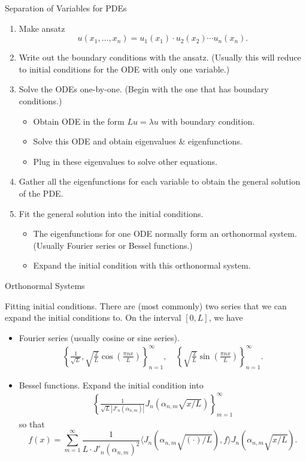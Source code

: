 \documentclass[hyperref={pdfpagelabels=true}]{beamer}
\newcommand{\structb}[1]{\textcolor[rgb]{0.2,0.2,0.7}{#1}}
\begin{document}
\begin{frame}{Separation of Variables for PDEs}

\begin{enumerate}
	\justifying
	\item Make ansatz
	$$u(x_1, \ldots, x_n) = u_1(x_1)\cdot u_2(x_2)\cdots u_n(x_n).$$
	\item Write out the boundary conditions with the ansatz. (Usually this will reduce to initial conditions for the ODE with only one variable.)
	\item Solve the ODEs one-by-one. (Begin with the one that has boundary conditions.)
	\begin{itemize}
		\justifying
		\item Obtain ODE in the form $Lu = \lambda u$ with boundary condition.
		\item Solve this ODE and obtain eigenvalues \& eigenfunctions.
		\item Plug in these eigenvalues to solve other equations.
	\end{itemize}
	\item Gather all the eigenfunctions for each variable to obtain the general solution of the PDE.
	\item Fit the general solution into the initial conditions.
	\begin{itemize}
		\justifying
		\item The eigenfunctions for one ODE normally form an orthonormal system. (Usually Fourier series or Bessel functions.)
		\item Expand the initial condition with this orthonormal system.
	\end{itemize}
\end{enumerate}

\end{frame}

\begin{frame}{Orthonormal Systems}

\justifying
\structb{Fitting initial conditions.} There are (most commonly) two series that we can expand the initial conditions to. On the interval $[0, L]$, we have
\begin{itemize}
\justifying
\item Fourier series (usually cosine or sine series).
\begin{align*}
\left\{\frac{1}{\sqrt{L}}, \sqrt{\frac{2}{L}}\cos\left(\frac{\pi nx}{L} \right) \right\}^{\infty}_{n=1}, \quad \left\{\sqrt{\frac{2}{L}}\sin\left(\frac{\pi nx}{L} \right) \right\}^{\infty}_{n=1}.
\end{align*}
\item Bessel functions. Expand the initial condition into
\begin{align*}
\left\{\frac{1}{\sqrt{L}|J'_n(\alpha_{n, m})|} J_n(\alpha_{n, m}\sqrt{x/L}) \right\}_{m=1}^{\infty}
\end{align*}
so that
$$f(x) = \sum_{m=1}^{\infty}\frac{1}{L\cdot J'_n(\alpha_{n, m})^2}\langle J_n(\alpha_{n, m}\sqrt{(\cdot)/L}), f\rangle J_n(\alpha_{n, m}\sqrt{x/L}).$$
\end{itemize}

\end{frame}
\end{document}

